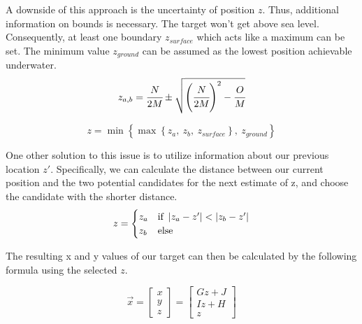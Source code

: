 A downside of this approach is the uncertainty of position $z$. Thus, additional information on bounds is necessary. The target won't get above sea level. Consequently, at least one boundary $z_{surface}$ which acts like a maximum can be set. The minimum value $z_{ground}$ can be assumed as the lowest position achievable underwater. 
\begin{equation}
	z_{a,b}=\cfrac{{N}}{2{M}}\pm\sqrt{\left(\cfrac{{N}}{2{M}}\right)^2-\cfrac{{O}}{{M}}}
\end{equation}	

\begin{equation}
	z=\min\left\{\max\left\{z_a,~z_b,~z_{surface}\right\},~z_{ground}\right\}
\end{equation}	

One other solution to this issue is to utilize information about our previous location $z'$. Specifically, we can calculate the distance between our current position and the two potential candidates for the next estimate of z, and choose the candidate with the shorter distance.
\begin{equation}
	z=\begin{cases}
		z_a & \text{if }\left|{z_a-z'}\right|<\left|{z_b-z'}\right|\\
		z_b & \text{else}
	\end{cases}
\end{equation}	

The resulting x and y values of our target can then be calculated by the following formula using the selected $z$.

\begin{equation}
			\vec{x}
	=\left[
	\begin{array}{c}
		x\\
		y\\
		z
	\end{array}
	\right]
=\left[
	\begin{array}{c}
		{G}z+{J}\\
		{I}z+{H}\\
		z
	\end{array}
	\right]
\end{equation}	

